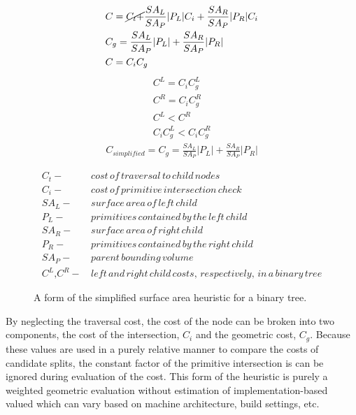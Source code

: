 \begin{figure}[H]
  \begin{align}
&C =  \cancel{C_{t} +} \frac{SA_{L}}{SA_{P}} |P_{L}|C_{i} + \frac{SA_{R}}{SA_{P}} |P_{R}|C_{i} \\
&C_{g} = \frac{SA_{L}}{SA_{P}} |P_{L}| +  \frac{SA_{R}}{SA_{P}}|P_{R}| \\
&C = C_{i}C_{g}
  \end{align}
  \begin{align*}
    C^{L} = C_{i} C^{L}_{g} \\
    C^{R} = C_{i} C^{R}_{g} \\
    C^{L} < C^{R} \\
    C_{i}C^{L}_{g} < C_{i}C^{R}_{g}
  \end{align*}
  \begin{align}
    C_{simplified} = C_{g} = \frac{SA_{L}}{SA_{P}} |P_{L}| +
    \frac{SA_{R}}{SA_{P}}|P_{R}|
    \label{eq:simplified_sah}
  \end{align}

  \begin{align*}
    C_{t} - & \,cost\, of\, traversal\, to\, child\, nodes \\
    C_{i} - & \, cost\, of\, primitive\, intersection\, check\, \\
    SA_{L} - &  \,surface\, area\, of\, left\, child \\
    P_{L} - & \, primitives\, contained\, by\, the\, left\, child  \\
    SA_{R} - & \, surface\, area\, of\, right\, child \\
    P_{R} - & \, primitives\, contained\, by\, the\, right\, child \\
    SA_{P} - & \, parent\, bounding\, volume \\
    C^{L} \text{,} C^{R} - & \, left \, and \, right \, child \, costs, \, respectively, \, in \, a \, binary \, tree
  \end{align*}

  \caption[Definition of the simplified surface area heuristic.]{A form of the
    simplified surface area heuristic for a binary tree.}
  \label{fig:SSAH}
\end{figure}

By neglecting the traversal cost, the cost of the node can be broken into two
components, the cost of the intersection, $C_{i}$ and the geometric cost,
$C_{g}$. Because these values are used in a purely relative manner to compare
the costs of candidate splits, the constant factor of the primitive intersection
is can be ignored during evaluation of the cost. This form of the heuristic is
purely a weighted geometric evaluation without estimation of
implementation-based valued which can vary based on machine architecture, build
settings, etc.


